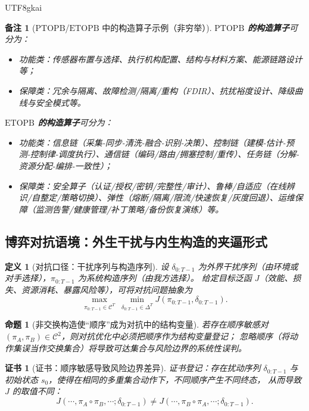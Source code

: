 \documentclass[12pt]{article}
\newtheorem{definition}{定义}[section]
\newtheorem{proposition}{命题}[section]
\newtheorem{remark}{备注}[section]
\newtheorem{Certificate}{证书}[section]
\newcommand{\PTOPB}{\ensuremath{\mathrm{PTOPB}}}
\newcommand{\ETOPB}{\ensuremath{\mathrm{ETOPB}}}
\begin{document}
\begin{CJK*}{UTF8}{gkai}
\begin{remark}[\PTOPB/\ETOPB{} 中的构造算子示例（非穷举）]
\textbf{\PTOPB{} 的构造算子}可分为：
\begin{itemize}
  \item 功能类：传感器布置与选择、执行机构配置、结构与材料方案、能源链路设计等；
  \item 保障类：冗余与隔离、故障检测/隔离/重构（FDIR）、抗扰裕度设计、降级曲线与安全模式等。
\end{itemize}

\textbf{\ETOPB{} 的构造算子}可分为：
\begin{itemize}
  \item 功能类：信息链（采集-同步-清洗-融合-识别-决策）、控制链（建模-估计-预测-控制律-调度执行）、通信链（编码/路由/拥塞控制/重传）、任务链（分解-资源分配-编排-一致性）；
  \item 保障类：安全算子（认证/授权/密钥/完整性/审计）、鲁棒/自适应（在线辨识/自整定/策略切换）、弹性（熔断/隔离/限流/快速恢复/灰度回退）、运维保障（监测告警/健康管理/补丁策略/备份恢复演练）等。
\end{itemize}
\end{remark}

\subsection{博弈对抗语境：外生干扰与内生构造的夹逼形式}
\label{sec:game-adversarial}

\begin{definition}[对抗口径：干扰序列与构造序列]
设 $\delta_{0:T-1}$ 为外界干扰序列（由环境或对手选择），$\pi_{0:T-1}$ 为系统构造序列（由我方选择）。
给定目标泛函 $J$（效能、损失、资源消耗、暴露风险等），可将对抗问题抽象为
\[
  \max_{\pi_{0:T-1}\in\mathcal{C}^{T}}
  \ \min_{\delta_{0:T-1}\in\Delta^{T}}
  J(\pi_{0:T-1},\delta_{0:T-1}).
\]
\end{definition}

\begin{proposition}[非交换构造使“顺序”成为对抗中的结构变量]
\label{prop:order-is-structural-in-adversarial}
若存在顺序敏感对 $(\pi_A,\pi_B)\in\mathcal{C}^2$，则对抗优化中必须把顺序作为结构变量登记；
忽略顺序（将动作集误当作交换集合）将导致可达集合与风险边界的系统性误判。
\end{proposition}

\begin{Certificate}[证书：顺序敏感导致风险边界差异]
\label{cert:order-is-structural}
证书登记：存在扰动序列 $\delta_{0:T-1}$ 与初始状态 $s_0$，使得在相同的多重集合动作下，不同顺序产生不同终态，
从而导致 $J$ 的取值不同：
\[
  J(\cdots,\pi_A\circ\pi_B,\cdots;\delta_{0:T-1})
  \neq
  J(\cdots,\pi_B\circ\pi_A,\cdots;\delta_{0:T-1}).
\]
\end{Certificate}


\end{CJK*}
\end{document}
